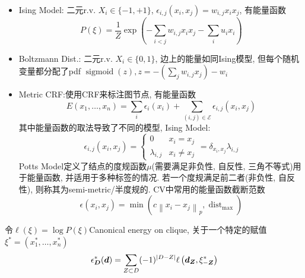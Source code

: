 \documentclass{article}
\begin{document}
\begin{flushleft}
    \begin{example}
        \begin{itemize}
            \item Ising Model: 二元r.v. $X_i\in\{-1, +1\}$, $\epsilon_{i, j}\left(x_{i}, x_{j}\right)=w_{i, j} x_{i} x_{j}$, 有能量函数\begin{equation}
                P(\xi)=\frac{1}{Z} \exp \left(-\sum_{i<j} w_{i, j} x_{i} x_{j}-\sum_{i} u_{i} x_{i}\right)
            \end{equation}
            \item Boltzmann Dist.: 二元r.v. $X_i\in\{0, 1\}$, 边上的能量如同Ising模型, 但每个随机变量都分配了pdf $\operatorname{sigmoid}(z),z=-\left(\sum_{j} w_{i, j} x_{j}\right)-w_{i}$
            \item Metric CRF:使用CRF来标注图节点, 有能量函数\begin{equation}
                E\left(x_{1}, \ldots, x_{n}\right)=\sum_{i} \epsilon_{i}\left(x_{i}\right)+\sum_{(i, j) \in \mathcal{E}} \epsilon_{i, j}\left(x_{i}, x_{j}\right)
            \end{equation}
            其中能量函数的取法导致了不同的模型, Ising Model:
            \begin{equation}
                \epsilon_{i, j}\left(x_{i}, x_{j}\right)=\left\{\begin{array}{ll}
                0 & x_{i}=x_{j} \\
                \lambda_{i, j} & x_{i} \neq x_{j}
                \end{array}\right.=\delta_{x_i, x_j}\lambda_{i, j}
            \end{equation}
            Potts Model定义了结点的度规函数$\mu$(需要满足非负性, 自反性, 三角不等式)用于能量函数, 并适用于多种标签的情况. 若一个度规满足前二者(非负性, 自反性), 则称其为semi-metric/半度规的. CV中常用的能量函数截断范数
            \begin{equation}
                \epsilon\left(x_{i}, x_{j}\right)=\min \left(c\left\|x_{i}-x_{j}\right\|_{p}, \operatorname{dist}_{\max }\right)
            \end{equation}
        \end{itemize}
    \end{example}

    \begin{definition}
        令$\ell (\xi)=\log P(\xi)$Canonical energy on clique, 关于一个特定的赋值$\xi^{*}=\left(x_{1}^{*}, \ldots, x_{n}^{*}\right)$
        \begin{equation}
            \epsilon_{\boldsymbol{D}}^{*}(\boldsymbol{d})=\sum_{Z \subset D}(-1)^{|D-Z|} \ell\left(\boldsymbol{d}_{\boldsymbol{Z}}, \xi_{-\boldsymbol{Z}}^{*}\right)
        \end{equation}
    \end{definition}


\end{flushleft}
\end{document}
